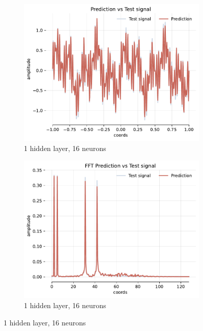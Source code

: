 \begin{figure}[h!]
    \centering
    \begin{subfigure}[b]{0.40\textwidth}
        \centering
        \includegraphics[width=\textwidth]{img/ch3/prediction_1hl_16hf_w10.pdf}
        \caption{1 hidden layer, 16 neurons}
        \label{fig:rec-1hl-16hf-w10}
    \end{subfigure}
    \begin{subfigure}[b]{0.40\textwidth}
        \centering
        \includegraphics[width=\textwidth]{img/ch3/fft_1hl_16hf_w10.pdf}
        \caption{1 hidden layer, 16 neurons}
        \label{fig:fft-1hl-16hf-w10}
    \end{subfigure}
    

\end{figure}
